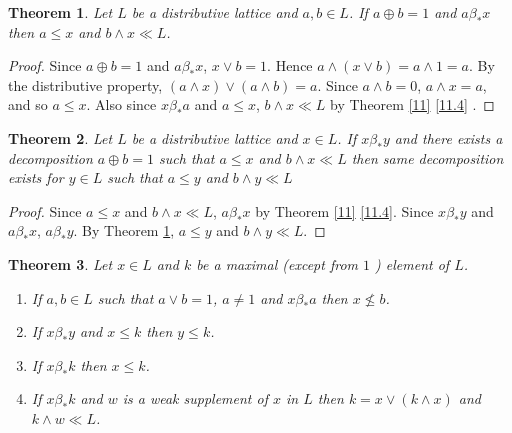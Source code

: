 \documentclass[a4paper,12pt]{article}
\newtheorem{theorem}{Theorem}[section]
\numberwithin{equation}{section}
\begin{document}
\begin{theorem}\label{12}
  Let $ L $ be a distributive lattice and $ a,b \in L $. If $ a \oplus b = 1 $ and $ a \beta_* x $ 
  then $ a \leq x $ and $ b \wedge x \ll L $.
\end{theorem}
\begin{proof}
  Since $ a \oplus b = 1 $ and $ a \beta_* x $, $ x \vee b = 1 $. Hence $ a \wedge ( x \vee b ) = a \wedge 1 = a $. 
  By the distributive property, $ ( a \wedge x ) \vee ( a \wedge b ) = a $. Since $ a \wedge b = 0 $, 
  $ a \wedge x = a $, and so $ a \leq x $. Also since $ x \beta_* a $ and $ a \leq x $, 
  $ b \wedge x \ll L $ by Theorem \ref{11} \ref{11.4} .
\end{proof}


\begin{theorem}\label{13}
  Let $ L $ be a distributive lattice and $ x \in L $. If $ x \beta_* y $ and there exists a 
  decomposition $ a \oplus b = 1 $ such that $ a \leq x $ and $ b \wedge x \ll L $ then same 
  decomposition exists for $ y \in L $ such that $ a \leq y $ and $ b \wedge y \ll L $
\end{theorem}
\begin{proof}
  Since $ a \leq x $ and $ b \wedge x \ll L $, $ a \beta_* x $ by Theorem \ref{11} \ref{11.4}. 
  Since $ x \beta_* y $ and $ a \beta_* x $, $ a \beta_* y $. 
  By Theorem \ref{12}, $ a \leq y $ and $ b \wedge y \ll L $.
\end{proof}

%
%
%
%
%
%

\begin{theorem}\label{14}
  Let $ x \in L $ and $ k $ be a maximal (except from $ 1 $ ) element of $ L $.
  \begin{enumerate}[label=(\roman{*}), ref=(\roman{*})]
    \item
      If $ a, b \in L $ such that $ a \vee b = 1 $, $ a \neq 1 $ and $ x \beta_* a $ then $ x \not\leq b $. \label{14.1}
      \label{14.1}
    \item
      If $ x \beta_*y $ and $ x \leq k $ then $ y \leq k $. \label{14.2}
    \item
      If $ x \beta_* k $ then $ x \leq k $. \label{14.3}
    \item
      If $ x \beta_* k $ and $ w $ is a weak supplement of $ x $ in $ L $ then $ k = x \vee ( k \wedge x ) $ 
      and  $ k \wedge w \ll L $. \label{14.4}
  \end{enumerate}
\end{theorem}
\end{document}
